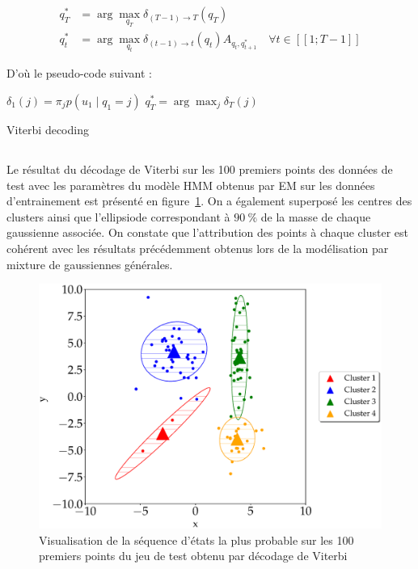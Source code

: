 \documentclass[12pt,a4paper,onecolumn]{article}
\begin{document}
\begin{align}
	q_T^* & = \operatorname{arg}\max_{q_T} \delta_{(T-1)\rightarrow T}(q_T)                                                      \\
	q_t^* & = \operatorname{arg}\max_{q_t} \delta_{(t-1)\rightarrow t}(q_t) A_{q_t, q_{t+1}^*} \quad \forall t \in [\![1;T-1]\!]
\end{align}

D'où le pseudo-code suivant :

\begin{algorithm}[H]
	\SetAlgoLined
	$\delta_1(j) = \pi_j p(u_1
		\mid q_1 = j)$\;
	$q_T^* = \operatorname{arg}\max_{j} \delta_T(j)$\;
	\caption{Viterbi decoding}
\end{algorithm}


\subsection{}

Le résultat du décodage de Viterbi sur les 100 premiers points des données de test avec les paramètres du modèle HMM obtenus par EM sur les données d'entrainement est présenté en figure~\ref{fig_8_viterbi}. On a également superposé les centres des clusters ainsi que l'ellipsiode correspondant à \(90~\%\) de la masse de chaque gaussienne associée. On constate que l'attribution des points à chaque cluster est cohérent avec les résultats précédemment obtenus lors de la modélisation par mixture de gaussiennes générales.

\begin{figure}[H]
	\centering
	\includegraphics[width = 1.0\textwidth]{8_viterbi_decoding}
	\caption{Visualisation de la séquence d'états la plus probable sur les 100 premiers points du jeu de test obtenu par décodage de Viterbi}
	\label{fig_8_viterbi}
\end{figure}
\end{document}
